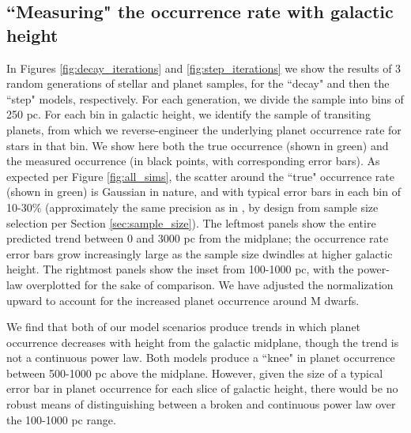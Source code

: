 \documentclass[twocolumn]{aastex631}
\begin{document}
\subsection{``Measuring" the occurrence rate with galactic height}

In Figures \ref{fig:decay_iterations} and \ref{fig:step_iterations} we show the results of 3 random generations of stellar and planet samples, for  the ``decay" and then the ``step" models, respectively. For each generation, we divide the sample into bins of 250 pc. For each bin in galactic height, we identify the sample of transiting planets, from which we reverse-engineer the underlying planet occurrence rate for stars in that bin. We show here both the true occurrence (shown in green) and the measured occurrence (in black points, with corresponding error bars). As expected per Figure \ref{fig:all_sims}, the scatter around the ``true" occurrence rate (shown in green) is Gaussian in nature, and with typical error bars in each bin of 10-30\% (approximately the same precision as in \citealt{zink_scaling_2023}, by design from sample size selection per Section \ref{sec:sample_size}). The leftmost panels show the entire predicted trend between 0 and 3000 pc from the midplane; the occurrence rate error bars grow increasingly large as the sample size dwindles at higher galactic height. The rightmost panels show the inset from 100-1000 pc, with the \cite{zink_scaling_2023} power-law overplotted for the sake of comparison. We have adjusted the normalization upward to account for the increased planet occurrence around M dwarfs. 

We find that both of our model scenarios produce trends in which planet occurrence decreases with height from the galactic midplane, though the trend is not a continuous power law. Both models produce a ``knee" in planet occurrence between 500-1000 pc above the midplane. However, given the size of a typical error bar in planet occurrence for each slice of galactic height, there would be no robust means of distinguishing between a broken and continuous power law over the 100-1000 pc range. 
\end{document}
